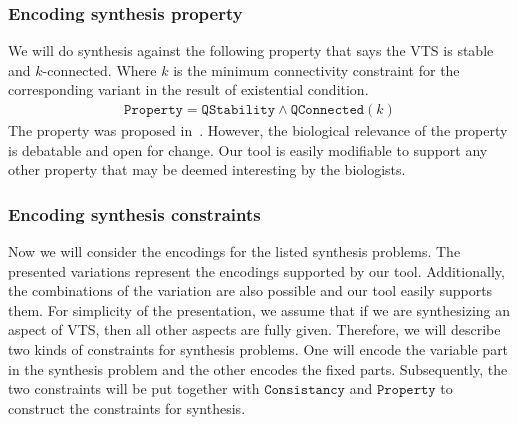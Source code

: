 \subsubsection{Encoding synthesis property}
%
We will do synthesis against the following property that says the VTS
is stable and $k$-connected.
%
Where $k$ is the minimum connectivity constraint for the corresponding variant in the result of existential condition.
%
\begin{align*}
\texttt{Property} =  \texttt{QStability} \land \texttt{QConnected}(k) 
\end{align*}
The property was proposed in~\cite{shukla2017discovering}.
%
However, the biological relevance of the property is debatable and open for change.
%
Our tool is easily modifiable to support any other property that may be deemed 
interesting by the biologists.

\subsubsection{Encoding synthesis constraints}

Now we will consider the encodings for the
listed synthesis problems.
%
The presented variations represent the encodings
supported by our tool.
%
Additionally, the combinations of the variation are also possible and
our tool easily supports them.
%
For simplicity of the presentation, we assume that if we are
synthesizing an aspect of VTS, then all other aspects are fully given.
%
Therefore, we will describe two kinds of constraints for synthesis
problems.
%
One will encode the variable part in the synthesis problem and
the other encodes the fixed parts.
%
Subsequently, the two constraints will be put together with 
$\texttt{Consistancy}$ and 
$\texttt{Property}$ to construct the constraints for synthesis.

